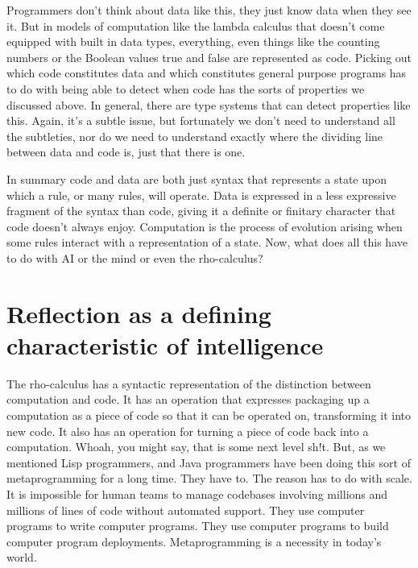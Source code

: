 \documentclass[runningheads]{llncs}
\begin{document}
\vspace{1\baselineskip}
Programmers don’t think about data like this, they just know data when they see it. But in models of computation like the lambda calculus that doesn’t come equipped with built in data types, everything, even things like the counting numbers or the Boolean values true and false are represented as code. Picking out which code constitutes data and which constitutes general purpose programs has to do with being able to detect when code has the sorts of properties we discussed above. In general, there are type systems that can detect properties like this. Again, it’s a subtle issue, but fortunately we don’t need to understand all the subtleties, nor do we need to understand exactly where the dividing line between data and code is, just that there is one. 

\vspace{1\baselineskip}
In summary code and data are both just syntax that represents a state upon which a rule, or many rules, will operate. Data is expressed in a less expressive fragment of the syntax than code, giving it a definite or finitary character that code doesn’t always enjoy. Computation is the process of evolution arising when some rules interact with a representation of a state. Now, what does all this have to do with AI or the mind or even the rho-calculus?

\vspace{1\baselineskip}
\section{Reflection as a defining characteristic of intelligence}

The rho-calculus has a syntactic representation of the distinction between computation and code. It has an operation that expresses packaging up a computation as a piece of code so that it can be operated on, transforming it into new code. It also has an operation for turning a piece of code back into a computation. Whoah, you might say, that is some next level sh!t. But, as we mentioned Lisp programmers, and Java programmers have been doing this sort of metaprogramming for a long time. They have to. The reason has to do with scale. It is impossible for human teams to manage codebases involving millions and millions of lines of code without automated support. They use computer programs to write computer programs. They use computer programs to build computer program deployments. Metaprogramming is a necessity in today’s world.
\end{document}
